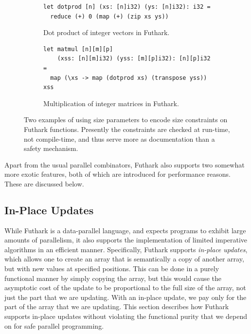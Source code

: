 \begin{figure}
  \centering
  \begin{subfigure}{1\textwidth}
    \begin{lstlisting}
let dotprod [n] (xs: [n]i32) (ys: [n]i32): i32 =
  reduce (+) 0 (map (+) (zip xs ys))
\end{lstlisting}
    \caption{Dot product of integer vectors in Futhark.}
    \label{fig:futhark-dotprod}
  \end{subfigure}
\par\bigskip
  \begin{subfigure}{1\textwidth}
\begin{lstlisting}
let matmul [n][m][p]
    (xss: [n][m]i32) (yss: [m][p]i32): [n][p]i32 =
  map (\xs -> map (dotprod xs) (transpose yss)) xss
\end{lstlisting}
    \caption{Multiplication of integer matrices in Futhark.}
    \label{fig:futhark-matmult}
  \end{subfigure}

  \caption{Two examples of using size parameters to encode size constraints on Futhark functions.  Presently the constraints are checked at run-time, not compile-time, and thus serve more as documentation than a safety mechanism.}
  \label{fig:futhark-size-parameters}
\end{figure}

Apart from the usual parallel combinators, Futhark also supports two
somewhat more exotic features, both of which are introduced for
performance reasons.  These are discussed below.

\subsection{In-Place Updates}
\label{sec:uniqueness-types}

While Futhark is a data-parallel language, and expects programs to
exhibit large amounts of parallelism, it also supports the
implementation of limited imperative algorithms in an efficient
manner.  Specifically, Futhark supports \textit{in-place updates},
which allows one to create an array that is semantically a copy of
another array, but with new values at specified positions.  This can
be done in a purely functional manner by simply copying the array, but
this would cause the asymptotic cost of the update to be proportional
to the full size of the array, not just the part that we are updating.
With an in-place update, we pay only for the part of the array that we
are updating.  This section describes how Futhark supports in-place
updates without violating the functional purity that we depend on for
safe parallel programming.

